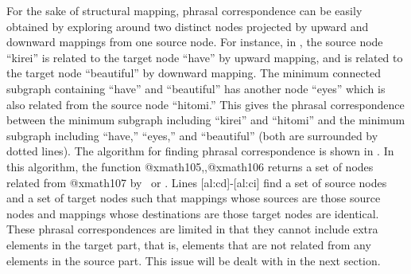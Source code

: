 For the sake of structural mapping, phrasal correspondence can be easily
obtained by exploring around two distinct nodes projected by upward and
downward mappings from one source node. For instance, in ,
the source node ``kirei'' is related to the target node ``have'' by upward
mapping, and is related to the target node ``beautiful'' by downward mapping. 
The minimum connected subgraph containing ``have'' and ``beautiful'' has
another node ``eyes'' which is also related from the source node ``hitomi.'' 
This gives the phrasal correspondence between the minimum subgraph including
``kirei'' and ``hitomi'' and the minimum subgraph including ``have,''
``eyes,'' and ``beautiful'' (both are surrounded by dotted lines).
The algorithm for finding phrasal correspondence is shown in
. In this algorithm, the function 
@xmath105\Mup,\Mdw,@xmath106 returns a set of nodes related from @xmath107 by \Mup\
or \Mdw. Lines [al:cd]-[al:ci] find a set of source nodes and a set
of target nodes such that mappings whose sources are those source nodes and
mappings whose destinations are those target nodes are identical. These
phrasal correspondences are limited in that they cannot include extra elements
in the target part, that is, elements that are not related from any elements
in the source part.  This issue will be dealt with in the next section.


